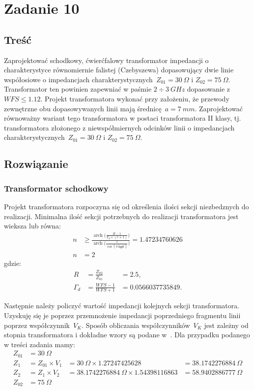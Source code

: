 \documentclass[rep.tex]{subfiles}
\begin{document}
\chapter{Zadanie 10}
\label{zad10}
\section{Treść}
Zaprojektować schodkowy, ćwierćfalowy transformator impedancji o charakterystyce
równomiernie falistej (Czebyszewa) dopasowujący dwie linie współosiowe o impedancjach
charakterystycznych~$Z_{01} = 30~\Omega$ i $Z_{02} = 75~\Omega$.
Transformator ten powinien zapewniać w paśmie $2 \div 3~GHz$ dopasowanie z $WFS \le 1.12$.
Projekt transformatora wykonać przy założeniu,
że przewody zewnętrzne obu dopasowywanych linii mają średnicę~$a = 7~mm$.
Zaprojektować równoważny wariant tego transformatora w postaci transformatora II klasy,
tj. transformatora złożonego z niewspółmiernych odcinków linii o impedancjach
charakterystycznych~$Z_{01} = 30~\Omega$ i $Z_{02} = 75~\Omega$.

\section{Rozwiązanie}
\subsection{Transformator schodkowy}
\label{zad10:step}
Projekt transformatora rozpoczyna się od określenia ilości sekcji niezbedznych do realizacji.
Minimalna ilość sekcji potrzebnych do realizacji transformatora jest wieksza lub równa:
\begin{align}
  n &\ge \frac{\operatorname{arch}\Big(\frac{R - 1}{\Gamma_d \times (r + 1)}\Big)}{\operatorname{arch}\Big(\frac{1}{\cos(\pi \frac{1 - \omega}{2})}\Big)} = 1.47234760626 \\
  n &= 2 \nonumber
\end{align}
gdzie:\\
\begin{align}
  R &= \frac{Z_{02}}{Z_{01}} &= 2.5, \nonumber \\
  \Gamma_d &= \frac{WFS - 1}{WFS + 1} &= 0.0566037735849. \nonumber
\end{align}

Następnie należy policzyć wartość impedancji kolejnych sekcji transformatora.
Uzyskuję się je poprzez przemnożenie impedancji poprzedniego fragmentu linii poprzez współczynnik~$V_K$.
Sposób obliczania współczynników~$V_K$ jest zależny od stopnia transformatora i dokładne wzory są podane w~\cite{obwody}.
Dla przypadku podanego w treści zadania mamy:
\begin{align}
  Z_{01} &= 30~\Omega \nonumber \\
  Z_{1~} &= Z_{01} \times V_1 &= 30~\Omega \times 1.27247425628 &= 38.1742276884~\Omega \nonumber \\
  Z_{2~} &= Z_1 \times V_2 &= 38.1742276884~\Omega \times 1.54398116863 &= 58.9402886777~\Omega \nonumber \\
  Z_{02} &= 75~\Omega \nonumber
\end{align}
\end{document}
